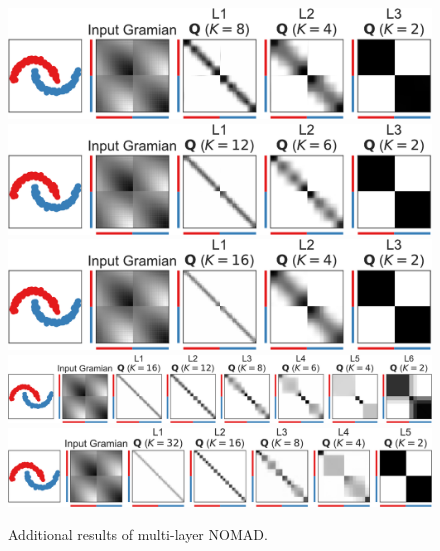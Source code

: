 \documentclass[twoside,11pt]{article}
\begin{document}
\begin{figure}
	\includegraphics[width=.618\linewidth]{multilayer/moons-8-4-2}%
	\\[2pt]
	\includegraphics[width=.618\linewidth]{multilayer/moons-12-6-2}%
	\\[2pt]
	\includegraphics[width=.618\linewidth]{multilayer/moons-16-4-2}%
	\\[2pt]
	\includegraphics[width=\linewidth]{multilayer/moons-16-12-8-6-4-2}%
	\\[2pt]
	\includegraphics[width=.873\linewidth]{multilayer/moons-32-16-8-4-2}%
	
	\caption{Additional results of multi-layer NOMAD.}
	\label{fig:additional_multilayer_moons}
\end{figure}
\end{document}
